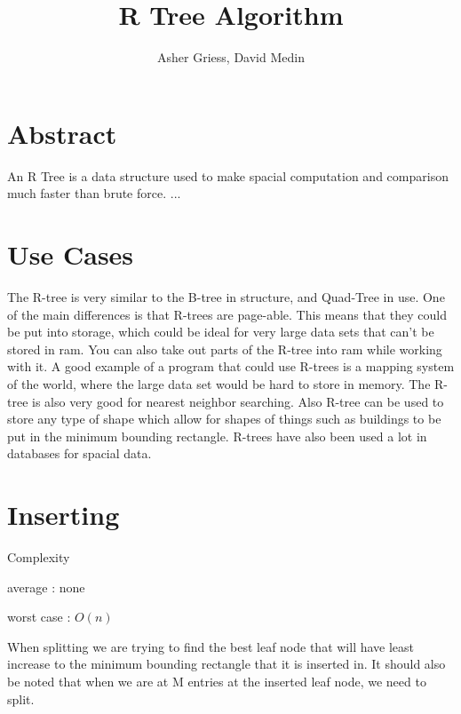 \documentclass{article}
\author{Asher Griess, David Medin}
\title{R Tree Algorithm}
\begin{document}
\maketitle

\section{Abstract}
An R Tree is a data structure used to make spacial computation and comparison much faster than brute force.  ...

\section{Use Cases}
The R-tree is very similar to the B-tree in structure, and Quad-Tree in use. One of the main differences is that
R-trees are page-able. This means that they could be put into storage, which could be ideal for very large data sets
that can't be stored in ram. You can also take out parts of the R-tree into ram while working with it. A good example
of a program that could use R-trees is a mapping system of the world, where the large data set would be hard to store in memory.
The R-tree is also very good for nearest neighbor searching. Also R-tree can be used to store any type of shape which allow for shapes
of things such as buildings to be put in the minimum bounding rectangle. R-trees have also been used a lot in databases for spacial data.


\section{Inserting}
Complexity

average : none

worst case : $O(n)$

When splitting we are trying to find the best leaf node
that will have least increase to the minimum bounding rectangle that it is inserted in.
It should also be noted that when we are at M entries at the inserted leaf node, we
need to split.

\usetikzlibrary{shapes}
\end{document}
